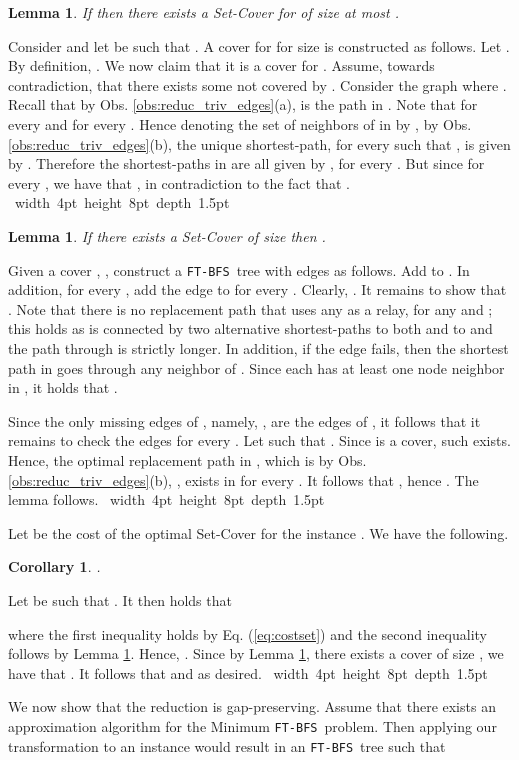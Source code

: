 \documentclass[12pt]{article}
\newtheorem{lemma}[theorem]{Lemma}
\newtheorem{corollary}[theorem]{Corollary}
\def\Proof{\par\noindent{\bf Proof:~}}
\def\blackslug{\hbox{\hskip 1pt \vrule width 4pt height 8pt
    depth 1.5pt \hskip 1pt}}
\def\QED{\quad\blackslug\lower 8.5pt\null\par}
\def\FTBFS{\mbox{\tt FT-BFS}}
\begin{document}
\begin{lemma}
\label{cl:reduc_a}
If  then
there exists a Set-Cover for 
of size at most .
\end{lemma}
\Proof
Consider  and let  be such that
.
A cover  for  for size  is constructed as follows.
Let .
By definition, .
We now claim that it is a cover for .
Assume, towards contradiction, that there exists some 
not covered by . Consider the graph  where . Recall that by Obs. \ref{obs:reduc_triv_edges}(a),  is the  path in . Note that  for every 
and  for every .
Hence denoting the set of neighbors of  in  by
, by Obs. \ref{obs:reduc_triv_edges}(b),
the unique  shortest-path, for every  such that , is given by .
Therefore the  shortest-paths in  are all given by , for every . But since  for every , we have that , in contradiction to the fact that .
\QED
\begin{lemma}
\label{cl:reduc_b}
If there exists a Set-Cover of size  then
.
\end{lemma}
\Proof
Given a cover , , construct a \FTBFS\ tree  with  edges as follows. Add  to . In addition, for every , add the edge  to  for every . Clearly, . It remains to show that .
Note that there is no  replacement path that uses any  as a relay, for any  and ; this holds as  is connected by two alternative shortest-paths to both  and to  and the path through  is strictly longer. In addition, if the edge  fails, then the  shortest path in  goes through any neighbor  of . Since each  has at least one  node neighbor in , it holds that .
\par Since the only missing edges of , namely, , are the edges of , it follows that
it remains to check the edges  for every . Let  such that . Since  is a cover, such  exists. Hence, the optimal  replacement path in
, which is by Obs. \ref{obs:reduc_triv_edges}(b), , exists in  for every .
It follows that , hence . The lemma follows.
\QED
Let  be the cost of the optimal Set-Cover for the instance . We have the following.
\begin{corollary}
\label{cor:reduc_opt}
.
\end{corollary}
\Proof
Let  be such that .
It then holds that

where the first inequality holds by Eq. (\ref{eq:costset}) and the second inequality follows by Lemma \ref{cl:reduc_b}. Hence, .
Since by Lemma \ref{cl:reduc_a},
there exists a cover of size , we have that  .
It follows that  and  as desired.
\QED
We now show that the reduction is gap-preserving.
Assume that there exists an  approximation algorithm  for the Minimum \FTBFS\ problem. Then applying our transformation to an instance  would result in an \FTBFS\ tree  such that
\end{document}
